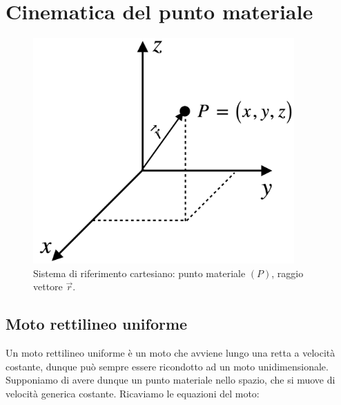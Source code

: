 \chapter{Cinematica del punto materiale}

\begin{figure}[htbp]
\begin{center}
\includegraphics[width=10cm]{images/assi.png} 
\caption{Sistema di riferimento cartesiano: punto materiale $(P)$, raggio vettore $\vec r$.}
\label{default}
\end{center}
\end{figure}



\section{Moto rettilineo uniforme}
Un moto rettilineo uniforme è un moto che avviene lungo una retta a velocità costante, dunque può sempre essere ricondotto ad un moto unidimensionale.\\
Supponiamo di avere dunque un punto materiale nello spazio, che si muove di velocità generica costante. Ricaviamo le equazioni del moto: